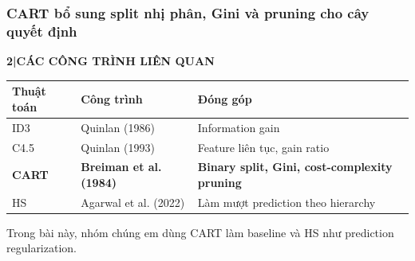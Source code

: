 \documentclass[aspectratio=169,12pt]{beamer}
\renewcommand{\arraystretch}{1.18}
\newcommand{\chaptertag}[2]{%
  \vspace{-0.16cm}%
  {\scriptsize\bfseries\textcolor{boxframe}{#1\enspace |\enspace #2}}\par
  \vspace{0.12cm}%
}
\begin{document}
\begin{frame}
  \frametitle{CART bổ sung split nhị phân, Gini và pruning cho cây quyết định}
  \chaptertag{2}{CÁC CÔNG TRÌNH LIÊN QUAN}
  \small
  {\renewcommand{\arraystretch}{1.28}%
  \begin{tabularx}{\textwidth}{@{}L{2.2cm}L{2.8cm}Y@{}}
    \toprule
    \textbf{Thuật toán} & \textbf{Công trình} & \textbf{Đóng góp} \\
    \midrule
    ID3 & Quinlan (1986) & Information gain \\
    C4.5 & Quinlan (1993) & Feature liên tục, gain ratio \\
    \textcolor{primaryblue}{\textbf{CART}} & \textcolor{primaryblue}{\textbf{Breiman et al. (1984)}} & \textcolor{primaryblue}{\textbf{Binary split, Gini, cost-complexity pruning}} \\
    HS & Agarwal et al. (2022) & Làm mượt prediction theo hierarchy \\
    \bottomrule
  \end{tabularx}}
  \par\vspace{0.42cm}
  \begin{center}
    Trong bài này, nhóm chúng em dùng CART làm baseline và HS như prediction regularization.
  \end{center}
\end{frame}
\end{document}
